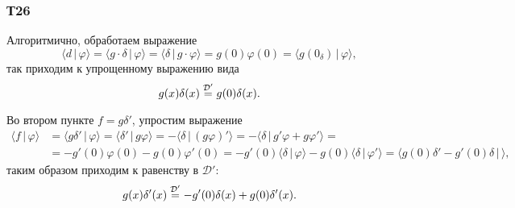 \subsubsection*{Т26}

Алгоритмично, обработаем выражение
\begin{equation*}
    \langle d \,|\, \varphi \rangle = \langle g \cdot \delta \,|\, \varphi  \rangle  = 
    \langle \delta \,|\, g \cdot \varphi \rangle  = g(0) \varphi(0) = \langle g(0_ \delta) \,|\, \varphi \rangle ,
\end{equation*}
так приходим к упрощенному выражению вида
\begin{equation*}
    g(x) \delta(x) \overset{\mathcal D'}{=} g(0) \delta(x).
\end{equation*}

Во втором пункте $f = g \delta'$, упростим выражение
\begin{align*}
    \langle f \,|\, \varphi \rangle  &= \langle g \delta' \,|\, \varphi \rangle = 
    \langle \delta' \,|\, g \varphi \rangle  = - \langle \delta \,|\, (g\varphi)' \rangle = -
    \langle \delta \,|\, g' \varphi + g \varphi' \rangle  
    = \\ &=
    -g'(0) \varphi(0) - g(0) \varphi'(0) = - g'(0) \langle \delta \,|\, \varphi \rangle - g(0) \langle \delta \,|\, \varphi' \rangle = \langle g(0) \delta' - g'(0) \delta \,|\,  \rangle,
\end{align*}
таким образом приходим к равенству в $\mathcal D'$:
\begin{equation*}
    g(x) \delta'(x) \overset{\mathcal D'}{=} - g'(0) \delta(x) + g(0) \delta'(x).
\end{equation*}

